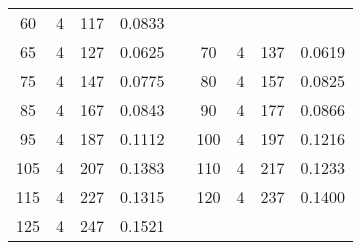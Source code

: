 \documentclass[a4paper, 12pt, french,oneside]{book}
\begin{document}
\begin{table}[!ht]
\begin{tabularx}{\linewidth}{|c|c|c|c|X|c|c|c|c|}
        60           & 4            & 117             & 0.0833                                                                                                           \\

        65           & 4            & 127             & 0.0625                        &  &

        70           & 4            & 137             & 0.0619                                                                                                           \\

        75           & 4            & 147             & 0.0775                        &  &

        80           & 4            & 157             & 0.0825                                                                                                           \\

        85           & 4            & 167             & 0.0843                        &  &

        90           & 4            & 177             & 0.0866                                                                                                           \\

        95           & 4            & 187             & 0.1112                        &  &

        100          & 4            & 197             & 0.1216                                                                                                           \\

        105          & 4            & 207             & 0.1383                        &  &

        110          & 4            & 217             & 0.1233                                                                                                           \\

        115          & 4            & 227             & 0.1315                        &  &

        120          & 4            & 237             & 0.1400                                                                                                           \\

        125          & 4            & 247             & 0.1521                        &  &


\end{tabularx}
\end{table}
\end{document}
